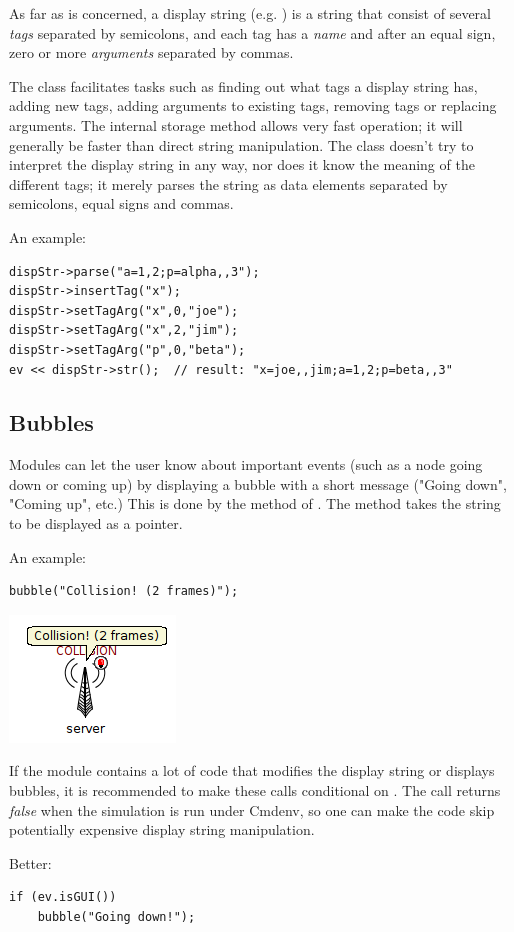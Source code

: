 As far as  is concerned, a display string
(e.g. ) is a string that consist of several
\textit{tags} separated by semicolons, and each tag has a \textit{name}
and after an equal sign, zero or more \textit{arguments} separated by commas.

The class facilitates tasks such as finding out what tags a display string
has, adding new tags, adding arguments to existing tags,
removing tags or replacing arguments. The internal storage method allows
very fast operation; it will generally be faster than direct string manipulation.
The class doesn't try to interpret the display string in any way, nor does
it know the meaning of the different tags; it merely parses the string
as data elements separated by semicolons, equal signs and commas.

An example:

\begin{verbatim}
dispStr->parse("a=1,2;p=alpha,,3");
dispStr->insertTag("x");
dispStr->setTagArg("x",0,"joe");
dispStr->setTagArg("x",2,"jim");
dispStr->setTagArg("p",0,"beta");
ev << dispStr->str();  // result: "x=joe,,jim;a=1,2;p=beta,,3"
\end{verbatim}

\subsection{Bubbles}

Modules can let the user know about important events (such as a node
going down or coming up) by displaying a bubble with a short message
("Going down", "Coming up", etc.) This is done by the  method
of . The method takes the string to be displayed
as a  pointer.

An example:
\begin{verbatim}
bubble("Collision! (2 frames)");
\end{verbatim}
\begin{center}
\includegraphics{figures/graphics-bubble}
\end{center}

If the module contains a lot of code that modifies the display string or
displays bubbles, it is recommended to make these calls conditional
on . The  call returns \textit{false}
when the simulation is run under Cmdenv, so one can make the code skip
potentially expensive display string manipulation.

Better:
\begin{verbatim}
if (ev.isGUI())
    bubble("Going down!");
\end{verbatim}

